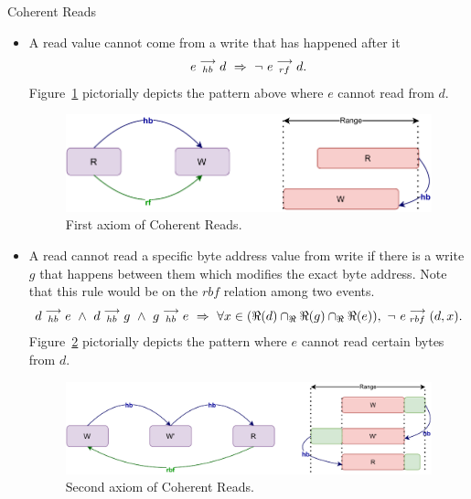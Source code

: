 \begin{axiom}{Coherent Reads}
            \begin{itemize}
                \item A read value cannot come from a write that has happened after it 
                    \begin{align*}
                        \reln{e}{hb}{d}\ \Rightarrow{}\ \neg \ \reln{e}{rf}{d}.
                    \end{align*}
                    Figure~\ref{model:coherent_reads(1)} pictorially depicts the pattern above where $e$ cannot read from $d$.
                    \begin{figure}[H]
                        \centering
                        \includegraphics[scale=0.7]{4.ECMAScriptMemoryModel/CoherentReads1.pdf}
                        \caption{First axiom of Coherent Reads.}
                        \label{model:coherent_reads(1)}
                    \end{figure}
                \item A read cannot read a specific byte address value from write if there is a write $g$ that happens between them which modifies the exact byte address. Note that this rule would be on the $rbf$ relation among two events. 
                    \begin{align*}
                        \reln{d}{hb}{e}
                        \ \wedge \ 
                        \reln{d}{hb}{g} \ \wedge \  \reln{g}{hb}{e}
                        \ \Rightarrow{} \
                        \forall x \in (\Re(d) \cap_\Re \Re(g) \cap_\Re \Re(e)), \ \neg \ \reln{e}{rbf}{(d,x)}.
                    \end{align*}
                    Figure~\ref{model:coherent_reads(2)} pictorially depicts the pattern where $e$ cannot read certain bytes from $d$. 
                    \begin{figure}[H]
                        \centering 
                        \includegraphics[scale=0.7]{4.ECMAScriptMemoryModel/CoherentReads2.pdf}
                        \caption{Second axiom of Coherent Reads.}
                        \label{model:coherent_reads(2)}
                    \end{figure}
                            
            \end{itemize}
        \end{axiom}

